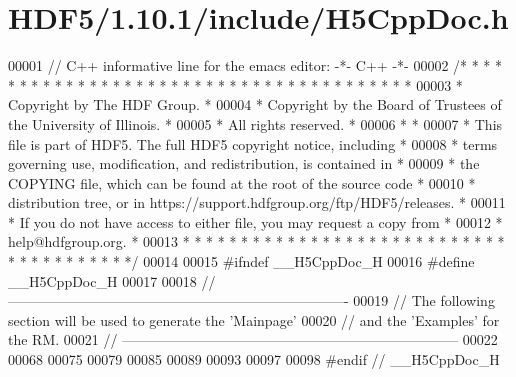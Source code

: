 \hypertarget{_h_d_f5_21_810_81_2include_2_h5_cpp_doc_8h_source}{}\section{H\+D\+F5/1.10.1/include/\+H5\+Cpp\+Doc.h}
\label{_h_d_f5_21_810_81_2include_2_h5_cpp_doc_8h_source}

\begin{DoxyCode}
00001 \textcolor{comment}{// C++ informative line for the emacs editor: -*- C++ -*-}
00002 \textcolor{comment}{/* * * * * * * * * * * * * * * * * * * * * * * * * * * * * * * * * * * * * * *}
00003 \textcolor{comment}{ * Copyright by The HDF Group.                                               *}
00004 \textcolor{comment}{ * Copyright by the Board of Trustees of the University of Illinois.         *}
00005 \textcolor{comment}{ * All rights reserved.                                                      *}
00006 \textcolor{comment}{ *                                                                           *}
00007 \textcolor{comment}{ * This file is part of HDF5.  The full HDF5 copyright notice, including     *}
00008 \textcolor{comment}{ * terms governing use, modification, and redistribution, is contained in    *}
00009 \textcolor{comment}{ * the COPYING file, which can be found at the root of the source code       *}
00010 \textcolor{comment}{ * distribution tree, or in https://support.hdfgroup.org/ftp/HDF5/releases.  *}
00011 \textcolor{comment}{ * If you do not have access to either file, you may request a copy from     *}
00012 \textcolor{comment}{ * help@hdfgroup.org.                                                        *}
00013 \textcolor{comment}{ * * * * * * * * * * * * * * * * * * * * * * * * * * * * * * * * * * * * * * */}
00014 
00015 \textcolor{preprocessor}{#ifndef \_\_H5CppDoc\_H}
00016 \textcolor{preprocessor}{#define \_\_H5CppDoc\_H}
00017 
00018 \textcolor{comment}{//-------------------------------------------------------------------------}
00019 \textcolor{comment}{// The following section will be used to generate the 'Mainpage'}
00020 \textcolor{comment}{// and the 'Examples' for the RM.}
00021 \textcolor{comment}{// ------------------------------------------------------------------------}
00022 
00068 
00075 
00079 
00085 
00089 
00093 
00097 
00098 \textcolor{preprocessor}{#endif // \_\_H5CppDoc\_H}
\end{DoxyCode}

